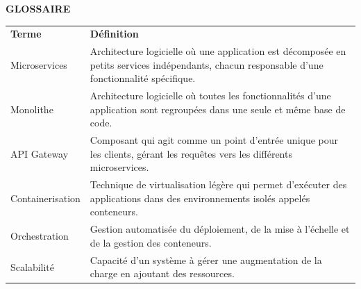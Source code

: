 \newpage
    \thispagestyle{normalpage}
    \begin{center}
        {\large\bfseries GLOSSAIRE}
    \end{center}
    \label{page:glossaire}

    \renewcommand{\arraystretch}{1.5 }
    \begin{center}
    \begin{tabular}{p{4cm} p{11cm}}
        \textbf{Terme} & \textbf{Définition} \\
        Microservices & Architecture logicielle où une application est décomposée en petits services indépendants, chacun responsable d'une fonctionnalité spécifique. \\
        Monolithe & Architecture logicielle où toutes les fonctionnalités d'une application sont regroupées dans une seule et même base de code. \\
        API Gateway & Composant qui agit comme un point d'entrée unique pour les clients, gérant les requêtes vers les différents microservices. \\
        Containerisation & Technique de virtualisation légère qui permet d'exécuter des applications dans des environnements isolés appelés conteneurs. \\
        Orchestration & Gestion automatisée du déploiement, de la mise à l'échelle et de la gestion des conteneurs. \\
        Scalabilité & Capacité d'un système à gérer une augmentation de la charge en ajoutant des ressources. \\
    \end{tabular}
    \end{center}
